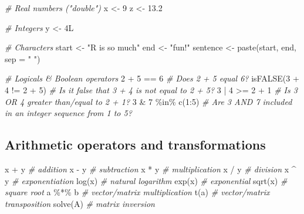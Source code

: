 \documentclass[
  11pt,
]{article}
\newenvironment{Shaded}{\begin{snugshade}}{\end{snugshade}}
\newcommand{\AttributeTok}[1]{\textcolor[rgb]{0.77,0.63,0.00}{#1}}
\newcommand{\CommentTok}[1]{\textcolor[rgb]{0.56,0.35,0.01}{\textit{#1}}}
\newcommand{\DecValTok}[1]{\textcolor[rgb]{0.00,0.00,0.81}{#1}}
\newcommand{\FloatTok}[1]{\textcolor[rgb]{0.00,0.00,0.81}{#1}}
\newcommand{\FunctionTok}[1]{\textcolor[rgb]{0.00,0.00,0.00}{#1}}
\newcommand{\NormalTok}[1]{#1}
\newcommand{\OtherTok}[1]{\textcolor[rgb]{0.56,0.35,0.01}{#1}}
\newcommand{\SpecialCharTok}[1]{\textcolor[rgb]{0.00,0.00,0.00}{#1}}
\newcommand{\StringTok}[1]{\textcolor[rgb]{0.31,0.60,0.02}{#1}}
\begin{document}
\begin{Shaded}
\begin{Highlighting}[]
\CommentTok{\# Real numbers ("double")}
\NormalTok{x }\OtherTok{\textless{}{-}} \DecValTok{9}
\NormalTok{z }\OtherTok{\textless{}{-}} \FloatTok{13.2}

\CommentTok{\# Integers}
\NormalTok{y }\OtherTok{\textless{}{-}}\NormalTok{ 4L}

\CommentTok{\# Characters}
\NormalTok{start }\OtherTok{\textless{}{-}} \StringTok{"R is so much"}
\NormalTok{end }\OtherTok{\textless{}{-}} \StringTok{"fun!"}
\NormalTok{sentence }\OtherTok{\textless{}{-}} \FunctionTok{paste}\NormalTok{(start, end, }\AttributeTok{sep =} \StringTok{" "}\NormalTok{)}

\CommentTok{\# Logicals \& Boolean operators}
\DecValTok{2} \SpecialCharTok{+} \DecValTok{5} \SpecialCharTok{==} \DecValTok{6}              \CommentTok{\# Does 2 + 5 equal 6?}
\FunctionTok{isFALSE}\NormalTok{(}\DecValTok{3} \SpecialCharTok{+} \DecValTok{4} \SpecialCharTok{!=} \DecValTok{2} \SpecialCharTok{+} \DecValTok{5}\NormalTok{) }\CommentTok{\# Is it false that 3 + 4 is not equal to 2 + 5?}
\DecValTok{3} \SpecialCharTok{|} \DecValTok{4} \SpecialCharTok{\textgreater{}=} \DecValTok{2} \SpecialCharTok{+} \DecValTok{1}          \CommentTok{\# Is 3 OR 4 greater than/equal to 2 + 1?}
\DecValTok{3} \SpecialCharTok{\&} \DecValTok{7} \SpecialCharTok{\%in\%} \FunctionTok{c}\NormalTok{(}\DecValTok{1}\SpecialCharTok{:}\DecValTok{5}\NormalTok{)       }\CommentTok{\# Are 3 AND 7 included in an integer sequence from 1 to 5?}
\end{Highlighting}
\end{Shaded}

\hypertarget{arithmetic-operators-and-transformations}{%
\subsection{Arithmetic operators and transformations}\label{arithmetic-operators-and-transformations}}

\begin{Shaded}
\begin{Highlighting}[]
\NormalTok{x }\SpecialCharTok{+}\NormalTok{ y     }\CommentTok{\# addition}
\NormalTok{x }\SpecialCharTok{{-}}\NormalTok{ y     }\CommentTok{\# subtraction}
\NormalTok{x }\SpecialCharTok{*}\NormalTok{ y     }\CommentTok{\# multiplication}
\NormalTok{x }\SpecialCharTok{/}\NormalTok{ y     }\CommentTok{\# division}
\NormalTok{x }\SpecialCharTok{\^{}}\NormalTok{ y     }\CommentTok{\# exponentiation}
\FunctionTok{log}\NormalTok{(x)    }\CommentTok{\# natural logarithm}
\FunctionTok{exp}\NormalTok{(x)    }\CommentTok{\# exponential}
\FunctionTok{sqrt}\NormalTok{(x)   }\CommentTok{\# square root}
\NormalTok{a }\SpecialCharTok{\%*\%}\NormalTok{ b   }\CommentTok{\# vector/matrix multiplication}
\FunctionTok{t}\NormalTok{(a)      }\CommentTok{\# vector/matrix transposition}
\FunctionTok{solve}\NormalTok{(A)  }\CommentTok{\# matrix inversion}
\end{Highlighting}
\end{Shaded}
\end{document}
